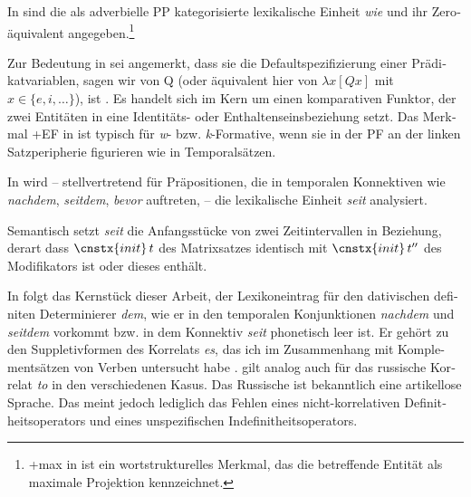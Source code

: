 \documentclass[output=paper, colorlinks, citecolor=brown, booklanguage=german]{langscibook}
\begin{document}
\begin{otherlanguage}{german}
In  sind die als adverbielle PP kategorisierte lexikalische Einheit \textit{wie} und
ihr Zeroäquivalent angegeben.\footnote{\label{fn:18:6}+max in  ist ein wortstrukturelles Merkmal, das die betreffende Entität als maximale Projektion kennzeichnet.}

\ea \label{ex:18:21}
	\z
\z

\noindent Zur Bedeutung in  sei angemerkt, dass sie die Defaultspezifizierung einer Prädikatvariablen, sagen wir von Q (oder äquivalent hier von $\lambda x [Q x]$ mit $x  \in \{e, i,\dots\}$), ist \citep{Zimmermann1995}. Es handelt sich im Kern um einen komparativen Funktor, der zwei Entitäten in eine Identitäts- oder Enthaltenseinsbeziehung setzt. Das Merkmal +EF in  ist typisch für \textit{w}- bzw. \textit{k}-Formative, wenn sie in der PF an der linken Satzperipherie figurieren wie in Temporalsätzen.

In  wird -- stellvertretend für Präpositionen, die in temporalen Kon\-nek\-ti\-ven wie \textit{nachdem}, \textit{seitdem}, \textit{bevor} auftreten, -- die lexikalische Einheit \textit{seit} ana\-ly\-siert.

\ea \label{ex:18:22}
	\z
\z

\noindent Semantisch setzt \textit{seit} die Anfangsstücke von zwei Zeitintervallen in Beziehung, derart dass $\cnstx{init}\, t$ des Matrixsatzes identisch mit $\cnstx{init}\, t''$ des Modifikators ist oder dieses enthält.

In  folgt das Kernstück dieser Arbeit, der Lexikoneintrag für den da\-ti\-vi\-schen definiten Determinierer \textit{dem}, wie er in den temporalen Konjunktionen \textit{nachdem} und \textit{seitdem} vorkommt bzw. in dem Konnektiv \textit{seit} phonetisch leer ist. Er gehört zu den Suppletivformen des Korrelats \textit{es}, das ich im Zusammenhang mit Komplementsätzen von Verben untersucht habe \citep{Zimmermann2016}.  gilt analog auch für das russische Korrelat \textit{to} in den verschiedenen Kasus. Das Russische ist bekanntlich eine artikellose Sprache. Das meint jedoch lediglich das Fehlen eines nicht-korrelativen Definitheitsoperators und eines unspezifischen Indefinitheitsoperators.


\end{otherlanguage}
\end{document}
